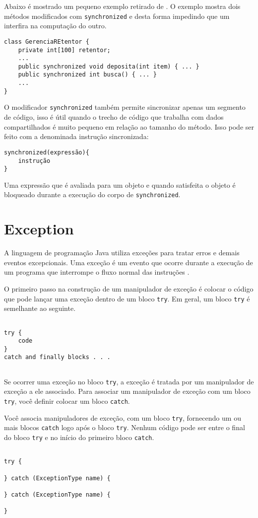 Abaixo é mostrado um pequeno exemplo retirado de \cite{sebesta}. O exemplo
mostra dois métodos modificados com \texttt{synchronized} e desta forma
impedindo que um interfira na computação do outro.

\begin{lstlisting}
class GerenciaREtentor {
    private int[100] retentor;
    ...
    public synchronized void deposita(int item) { ... }
    public synchronized int busca() { ... }
    ...
}
\end{lstlisting}

O modificador \texttt{synchronized} também permite sincronizar apenas um
segmento de código, isso é útil quando o trecho de código que trabalha com
dados compartilhados é muito pequeno em relação ao tamanho do método. Isso
pode ser feito com a denominada instrução sincronizada:

\begin{lstlisting}
synchronized(expressão){
    instrução
}
\end{lstlisting}

Uma expressão que é avaliada para um objeto e quando
satisfeita o objeto é bloqueado durante a execução do corpo de
\texttt{synchronized}.

\section{Exception}

A linguagem de programação Java utiliza exceções para tratar erros e
demais eventos excepcionais. Uma exceção é um evento que ocorre durante
a execução de um programa que interrompe o fluxo normal das instruções
\cite{except}.

O primeiro passo na construção de um manipulador de exceção é colocar
o código que pode lançar uma exceção dentro de um bloco \texttt{try}. Em geral,
um bloco \texttt{try} é semelhante ao seguinte.

\begin{lstlisting}

try {
    code
}
catch and finally blocks . . .
    
\end{lstlisting}


Se ocorrer uma exceção no bloco \texttt{try}, a exceção é tratada por um
manipulador de exceção a ele associado. Para associar um manipulador de
exceção com um bloco \texttt{try}, você definir colocar um bloco
\texttt{catch}.

Você associa manipuladores de exceção, com um bloco \texttt{try}, fornecendo
um ou mais blocos \texttt{catch} logo após o bloco \texttt{try}. Nenhum
código pode ser entre o final do bloco \texttt{try} e no início do primeiro bloco %
\texttt{catch}.

\begin{lstlisting}

try {
     
} catch (ExceptionType name) {
     
} catch (ExceptionType name) {
     
}  

\end{lstlisting}
